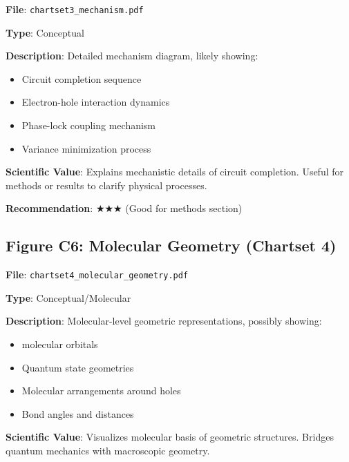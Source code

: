 \documentclass[11pt]{article}
\begin{document}
\textbf{File}: \texttt{chartset3\_mechanism.pdf}

\textbf{Type}: Conceptual

\textbf{Description}:
Detailed mechanism diagram, likely showing:
\begin{itemize}
\item Circuit completion sequence
\item Electron-hole interaction dynamics
\item Phase-lock coupling mechanism
\item Variance minimization process
\end{itemize}

\textbf{Scientific Value}:
Explains mechanistic details of circuit completion. Useful for methods or results to clarify physical processes.

\textbf{Recommendation}: $\bigstar\bigstar\bigstar$ (Good for methods section)

\subsection{Figure C6: Molecular Geometry (Chartset 4)}


\textbf{File}: \texttt{chartset4\_molecular\_geometry.pdf}

\textbf{Type}: Conceptual/Molecular

\textbf{Description}:
Molecular-level geometric representations, possibly showing:
\begin{itemize}
\item {} molecular orbitals
\item Quantum state geometries
\item Molecular arrangements around holes
\item Bond angles and distances
\end{itemize}

\textbf{Scientific Value}:
Visualizes molecular basis of geometric structures. Bridges quantum mechanics with macroscopic geometry.
\end{document}
